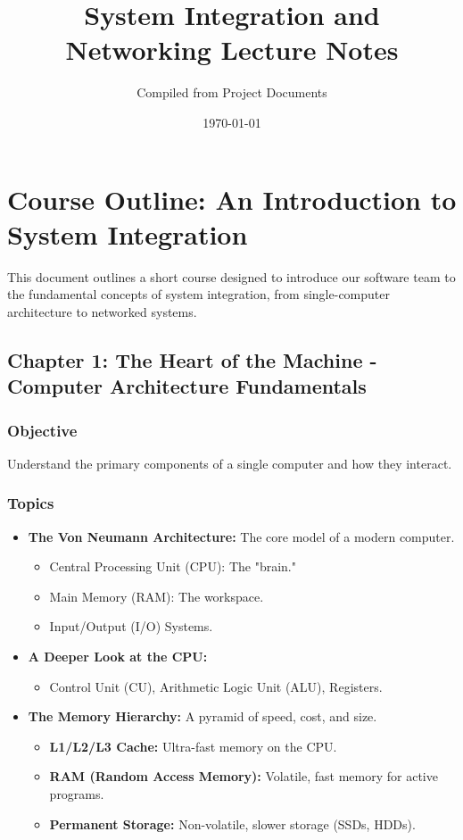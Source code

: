 \documentclass{article}
\title{System Integration and Networking Lecture Notes}
\author{Compiled from Project Documents}
\date{\today}
\begin{document}
\maketitle
\tableofcontents
\newpage

\section{Course Outline: An Introduction to System Integration}
This document outlines a short course designed to introduce our software team to the fundamental concepts of system integration, from single-computer architecture to networked systems.

\subsection{Chapter 1: The Heart of the Machine - Computer Architecture Fundamentals}
\subsubsection{Objective}
Understand the primary components of a single computer and how they interact.

\subsubsection{Topics}
\begin{itemize}
    \item \textbf{The Von Neumann Architecture:} The core model of a modern computer.
    \begin{itemize}
        \item Central Processing Unit (CPU): The "brain."
        \item Main Memory (RAM): The workspace.
        \item Input/Output (I/O) Systems.
    \end{itemize}
    \item \textbf{A Deeper Look at the CPU:}
    \begin{itemize}
        \item Control Unit (CU), Arithmetic Logic Unit (ALU), Registers.
    \end{itemize}
    \item \textbf{The Memory Hierarchy:} A pyramid of speed, cost, and size.
    \begin{itemize}
        \item \textbf{L1/L2/L3 Cache:} Ultra-fast memory on the CPU.
        \item \textbf{RAM (Random Access Memory):} Volatile, fast memory for active programs.
        \item \textbf{Permanent Storage:} Non-volatile, slower storage (SSDs, HDDs).
    \end{itemize}
\end{itemize}
\end{document}
